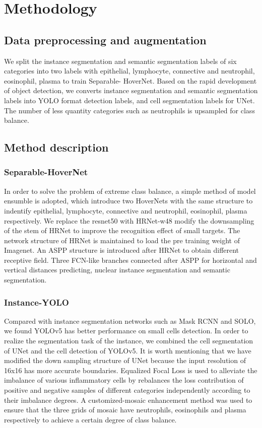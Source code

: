 \documentclass[conference]{IEEEtran}
\begin{document}
 

\section{Methodology}

\subsection{Data preprocessing and augmentation}

We split the instance segmentation and semantic segmentation labels of six categories into two labels with epithelial, lymphocyte, connective and neutrophil, eosinophil, plasma to train Separable- HoverNet. Based on the rapid development of object detection, we converts instance segmentation and semantic segmentation labels into YOLO format detection labels, and cell segmentation labels for UNet. The number of less quantity categories such as neutrophils is upsampled for class balance. 

\subsection{Method description}
\subsubsection{Separable-HoverNet}
In order to solve the problem of extreme class balance, a simple method of model ensumble is adopted, which introduce two HoverNets with the same structure to indentify epithelial, lymphocyte, connective and neutrophil, eosinophil, plasma respectively. We replace the resnet50 with HRNet-w48 modify the downsampling of the stem of HRNet to improve the recognition effect of small targets. The network structure of HRNet is maintained to load the pre training weight of Imagenet. An ASPP structure is introduced after HRNet to obtain different receptive field. Three FCN-like branches connected after ASPP for horizontal and vertical distances predicting, nuclear instance segmentation and semantic segmentation.
\subsubsection{Instance-YOLO}
Compared with instance segmentation networks such as Mask RCNN\cite{b5} and SOLO\cite{b6}, we found YOLOv5 has better performance on small cells detection. In order to realize the segmentation task of the instance, we combined the cell segmentation of UNet and the cell detection of YOLOv5. It is worth mentioning that we have modified the down sampling structure of UNet because the input resolution of 16x16 has more accurate boundaries. Equalized Focal Loss\cite{b7} is used to alleviate the imbalance of various inflammatory cells by rebalances the loss contribution of positive and negative samples of different categories independently according to their imbalance degrees. A customized-mosaic enhancement method was used to ensure that the three grids of mosaic have neutrophils, eosinophils and plasma respectively to achieve a certain degree of class balance.
\end{document}
